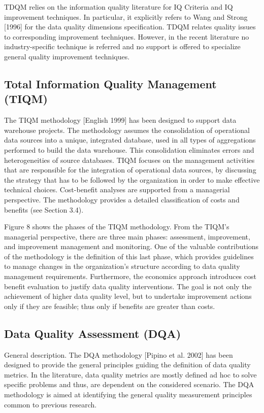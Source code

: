 \documentclass[pdftex,english,oribibl]{llncs}
\begin{document}
TDQM relies on the information quality literature for IQ Criteria and IQ improvement techniques.
In particular, it explicitly refers to Wang and Strong [1996] for the data quality dimensions specification.
TDQM relates quality issues to corresponding improvement techniques.
However, in the recent literature no industry-specific technique is referred and no support is offered to specialize general quality improvement techniques.


\subsection{Total Information Quality Management (TIQM)}

The TIQM methodology [English 1999] has been designed to support data warehouse projects. The methodology assumes the consolidation of operational data sources into a unique, integrated database, used in all types of aggregations performed to build the data warehouse. This consolidation eliminates errors and heterogeneities of source databases. TIQM focuses on the management activities that are responsible for the integration of operational data sources, by discussing the strategy that has to be followed by the organization in order to make effective technical choices. Cost-benefit analyses are supported from a managerial perspective. The methodology provides a detailed classification of costs and benefits (see Section 3.4).

Figure 8 shows the phases of the TIQM methodology.
From the TIQM’s managerial perspective, there are three main phases: assessment, improvement, and improvement management and monitoring.
One of the valuable contributions of the methodology is the definition of this last phase, which provides guidelines to manage changes in the organization’s structure according to data quality management requirements.
Furthermore, the economics approach introduces cost benefit evaluation to justify data quality interventions.
The goal is not only the achievement of higher data quality level, but to undertake improvement actions only if they are feasible; thus only if benefits are greater than costs.

\subsection{Data Quality Assessment (DQA)}
General description. The DQA methodology [Pipino et al. 2002] has been designed to provide the general principles guiding the definition of data quality metrics. In the literature, data quality metrics are mostly defined ad hoc to solve specific problems and thus, are dependent on the considered scenario. The DQA methodology is aimed at identifying the general quality measurement principles common to previous research.
\end{document}
